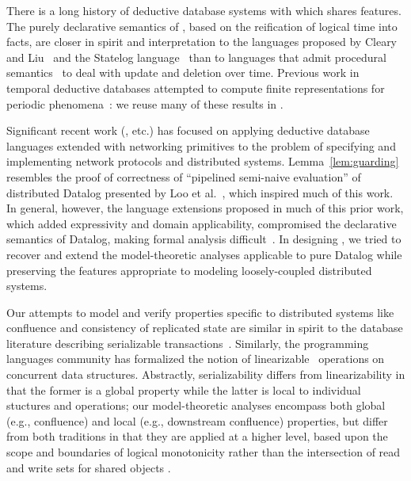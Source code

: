There is a long history of deductive database systems with which \lang
shares features.
The purely declarative semantics of \lang, based on the reification of logical time into
facts, are closer in spirit and interpretation to
the languages proposed by Cleary and Liu~\cite{harmful,deductiveupdates,starlog} and
the Statelog language~\cite{statelog} than
to languages that admit procedural semantics~\cite{ldl, glue-nail} to deal with update 
and deletion over time.
Previous work in temporal deductive databases attempted to compute finite representations for periodic phenomena~\cite{tdd-infinite}: we reuse many of these results in \lang.

Significant recent work (\cite{boom-techr,Belaramani:2009,Chu:2007,Loo2009-CACM}, etc.) has focused on applying deductive database languages extended with networking 
primitives to the problem of specifying and implementing network protocols and distributed systems.  Lemma~\ref{lem:guarding} resembles the proof of correctness of ``pipelined
semi-naive evaluation'' of distributed Datalog presented by Loo et al.~\cite{loo-sigmod06},
which inspired much of this work.  In general, however, the language extensions 
proposed in much of this prior work,
which added
expressivity and domain applicability, compromised the declarative
semantics of Datalog, making formal analysis difficult~\cite{navarro, Mao2009}.
In designing \lang, we tried to recover and extend the model-theoretic analyses applicable
to pure Datalog while preserving the features appropriate to modeling loosely-coupled
distributed systems.

Our attempts to model and verify properties specific to distributed systems like 
confluence and consistency of replicated state are similar in spirit to the database literature
describing serializable transactions~\cite{serializability}.  Similarly, the programming languages
community has formalized the notion of linearizable~\cite{linearizability} operations on
concurrent data structures.  Abstractly, serializability differs from linearizability in that the
former is a global property while the latter is local to individual stuctures and operations;
our model-theoretic analyses encompass both global (e.g., confluence) and local (e.g., downstream 
confluence) properties, but differ from both traditions in that they are applied at a higher
level, based upon the scope and boundaries of logical monotonicity rather than the intersection of read and write sets for shared objects .